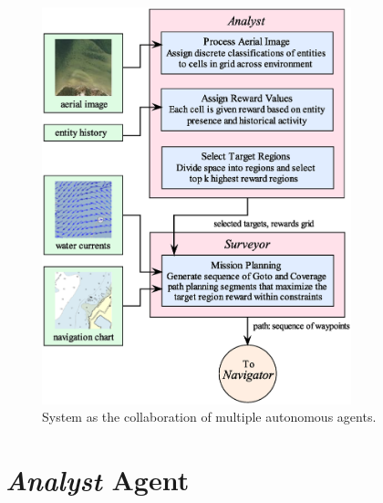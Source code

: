 \documentclass{tamuccthesis}
\begin{document}
\begin{figure}[H]
\center
\includegraphics[width=0.8\textwidth]{system_overview.eps}
\caption[System as the collaboration of multiple autonomous agents.]{System as the collaboration of multiple autonomous agents.}
\label{fig:system_overview}
\end{figure}

\section{\textit{Analyst} Agent}
\end{document}
